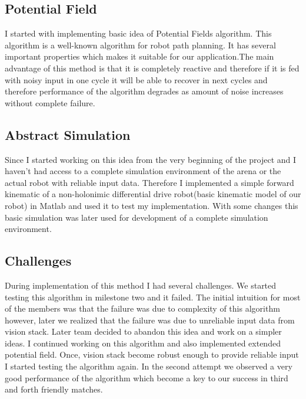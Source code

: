\documentclass[conference,12pt]{IEEEtran}
\begin{document}
\subsection{Potential Field}
I started with implementing basic idea of Potential Fields\cite{paper:PF} algorithm. This algorithm is a well-known algorithm for robot path planning. It has several important properties which makes it suitable for our application.The main advantage of this method is that it is completely reactive and therefore if it is fed with noisy input in one cycle it will be able to recover in next cycles and therefore performance of the algorithm degrades as amount of noise increases without complete failure.
\subsection{Abstract Simulation}
Since I started working on this idea from the very beginning of the project and I haven't had access to a complete simulation environment of the arena or the actual robot with reliable input data. Therefore I implemented a simple forward kinematic of a non-holonimic differential drive robot(basic kinematic model of our robot) in Matlab and used it to test my implementation. With some changes this basic simulation was later used for development of a complete simulation environment.
\subsection{Challenges}
During implementation of this method I had several challenges. We started testing this algorithm in milestone two and it failed. The initial intuition for most of the members was that the failure was due to complexity of this algorithm however, later we realized that the failure was due to unreliable input data from vision stack. Later team decided to abandon this idea and work on a simpler ideas. I continued working on this algorithm and also implemented extended potential field\cite{paper:OKhatib}. Once, vision stack become robust enough to provide reliable input I started testing the algorithm again. In the second attempt we observed a very good performance of the algorithm which become a key to our success in third and forth friendly matches.
\end{document}
